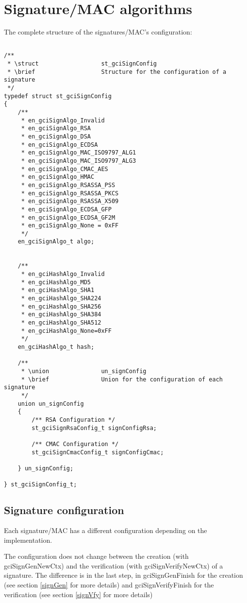 \chapter{Signature/MAC algorithms}
\label{signature}

The complete structure of the signatures/MAC's configuration:
\begin{lstlisting}

/**
 * \struct 					st_gciSignConfig
 * \brief					Structure for the configuration of a signature
 */
typedef struct st_gciSignConfig
{
	/**
	 * en_gciSignAlgo_Invalid
	 * en_gciSignAlgo_RSA
	 * en_gciSignAlgo_DSA
	 * en_gciSignAlgo_ECDSA
	 * en_gciSignAlgo_MAC_ISO9797_ALG1
	 * en_gciSignAlgo_MAC_ISO9797_ALG3
	 * en_gciSignAlgo_CMAC_AES
	 * en_gciSignAlgo_HMAC
	 * en_gciSignAlgo_RSASSA_PSS
	 * en_gciSignAlgo_RSASSA_PKCS
	 * en_gciSignAlgo_RSASSA_X509
	 * en_gciSignAlgo_ECDSA_GFP
	 * en_gciSignAlgo_ECDSA_GF2M
	 * en_gciSignAlgo_None = 0xFF
	 */
	en_gciSignAlgo_t algo;


	/**
	 * en_gciHashAlgo_Invalid
	 * en_gciHashAlgo_MD5
	 * en_gciHashAlgo_SHA1
	 * en_gciHashAlgo_SHA224
	 * en_gciHashAlgo_SHA256
	 * en_gciHashAlgo_SHA384
	 * en_gciHashAlgo_SHA512
	 * en_gciHashAlgo_None=0xFF
	 */
	en_gciHashAlgo_t hash;

	/**
	 * \union 				un_signConfig
	 * \brief				Union for the configuration of each signature
	 */
	union un_signConfig
	{
		/** RSA Configuration */
		st_gciSignRsaConfig_t signConfigRsa;

		/** CMAC Configuration */
		st_gciSignCmacConfig_t signConfigCmac;
		
	} un_signConfig;
	
} st_gciSignConfig_t;

\end{lstlisting}




\section{Signature configuration}
Each signature/MAC has a different configuration depending on the
implementation.

The configuration does not change between the creation (with
gciSignGenNewCtx) and the verification (with gciSignVerifyNewCtx) of a
signature.
The difference is in the last step, in gciSignGenFinish for the creation (see
section \ref{signGen} for more details) and gciSignVerifyFinish for the
verification (see section \ref{signVfy} for more details)

